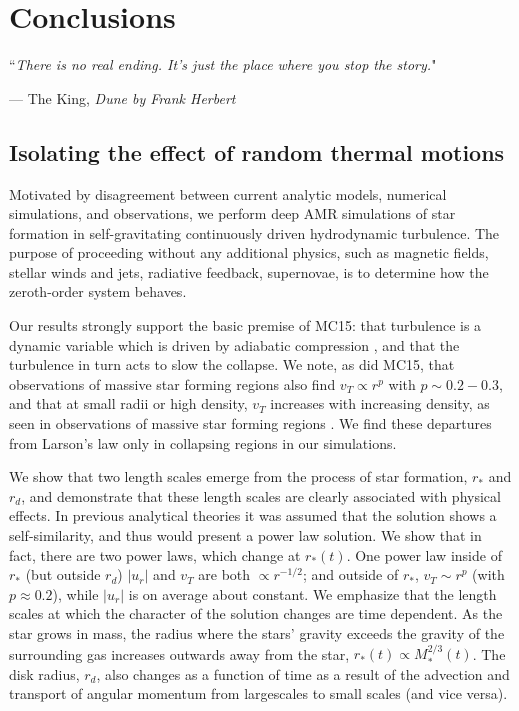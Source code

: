 \documentclass[../dissertation.tex]{subfiles}
\begin{document}
\chapter{Conclusions}
\label{ch:conclusions}

\singlespace
\epigraph{``\emph{There is no real ending. It's just the place where you stop the story.}"}{--- \textup{The King}, \textit{Dune by Frank Herbert}}

\dblspace

\section{Isolating the effect of random thermal motions}

Motivated by disagreement between current analytic models, numerical simulations, and observations, we perform deep AMR simulations 
of star formation in self-gravitating continuously driven hydrodynamic turbulence. 
The purpose of proceeding without any additional physics, such as magnetic fields, stellar winds and jets, radiative feedback, supernovae, 
is to determine how the zeroth-order system behaves.

Our results strongly support the basic premise of MC15: that turbulence is a dynamic variable 
which is driven by adiabatic compression \citep{2012ApJ...750L..31R}, and that the turbulence
in turn acts to slow the collapse. 
We note, as did MC15, that observations of massive star forming regions also find $v_T \propto r^p$ 
with $ p \sim 0.2-0.3$, and that at small radii or high density, $v_T$  
increases with increasing density, as seen in observations of massive star forming
regions \citep{1997ApJ...476..730P}. 
We find these departures from Larson's law only in
collapsing regions in our simulations. 

We show that two length scales emerge from the process of star formation, $r_*$ and $r_d$, and demonstrate
that these length scales are clearly associated with physical effects. 
In previous analytical theories it was assumed that the solution shows a self-similarity, and thus would present a power law solution.
We show that in fact, there are two power laws, which change at $r_*(t)$. 
One power law inside of $r_*$ (but outside $r_d$) $|u_r|$ and  $v_T$ are both
$\propto r^{-1/2}$; and outside of $r_*$, $v_T\sim r^{p}$ (with $p\approx0.2$), while $|u_r|$ 
is on average about constant. 
We emphasize that the length scales at which the character of the solution changes are time dependent. 
As the star grows in mass, the radius where the stars' gravity exceeds the gravity of the surrounding gas increases outwards away from the star, 
$r_*(t) \propto M_*^{2/3}(t)$.
The disk radius, $r_d$, also changes as a function of time as a result of the advection and transport of angular momentum from largescales to small scales (and vice versa).
\end{document}
